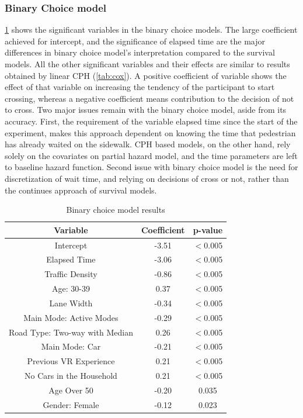 \subsubsection{Binary Choice model}
\cref{tab:bc} shows the significant variables in the binary choice models. The large coefficient achieved for intercept, and the significance of elapsed time are the major differences in binary choice model's interpretation compared to the survival models. All the other significant variables and their effects are similar to results obtained by linear CPH (\cref{tab:cox}). A positive coefficient of variable shows the effect of that variable on increasing the tendency of the participant to start crossing, whereas a negative coefficient means contribution to the decision of not to cross. Two major issues remain with the binary choice model, aside from its accuracy. First, the requirement of the variable elapsed time since the start of the experiment, makes this approach dependent on knowing the time that pedestrian has already waited on the sidewalk. CPH based models, on the other hand, rely solely on the covariates on partial hazard model, and the time parameters are left to baseline hazard function. Second issue with binary choice model is the need for discretization of wait time, and relying on decisions of cross or not, rather than the continues approach of survival models. 
\begin{table}
\caption{Binary choice model results}
\footnotesize
    \centering
    
    \begin{tabular}{|ccc|}
    \hline
         \textbf{Variable}&\textbf{Coefficient}& \textbf{p-value}  \\
    \hline
         Intercept&-3.51 & $<$0.005\\
    \hline
         Elapsed Time&-3.06&$<$0.005\\
    \hline
         Traffic Density&-0.86&$<$0.005\\
    \hline 
         Age: 30-39&0.37&$<$0.005\\
     \hline
         Lane Width&-0.34   &$<$0.005\\
    \hline
    Main Mode: Active Modes&-0.29	&$<$0.005\\
    \hline
         Road Type: Two-way with Median&  0.26&$<$0.005\\
    \hline
        Main Mode: Car&	-0.21&$<$0.005\\
    
    \hline
         Previous VR Experience& 0.21	&$<$0.005\\
    \hline
         No Cars in the Household&  0.21	&$<$0.005\\
    \hline
         Age Over 50&-0.20&0.035\\
    \hline
         Gender: Female&-0.12&0.023\\
    
    \hline
    
    \end{tabular}
    
    \label{tab:bc}
\end{table}
